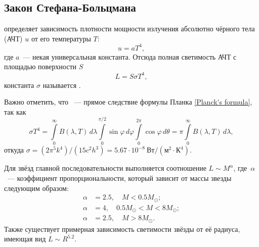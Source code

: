 \subsection{Закон Стефана-Больцмана}
 определяет зависимость плотности мощности излучения абсолютно чёрного тела (АЧТ) $u$ от его температуры $T$:
\begin{equation}
u = a T^4,
\end{equation} 
где $a$~--- некая универсальная константа.
Отсюда полная светимость АЧТ с площадью поверхности $S$
	\begin{equation}
	L = S \sigma T^4,
	\label{eq:steff-bol-law}
\end{equation}
константа $\sigma$ называется .
  
Важно отметить, что ~--- прямое следствие формулы Планка \eqref{Planck's formula}, так как
\begin{equation}
	\sigma T^4 = \int\limits^\infty_0 B(\lambda, T)\,d\lambda \int\limits_0^{\pi/2} \sin \varphi\, d\varphi \int\limits_0^{2\pi} \cos \varphi\, d\theta = \pi \int\limits^\infty_0 B(\lambda, T)\,d\lambda,
\end{equation}
откуда $\sigma = (2\pi^5k^4)/(15c^2h^3) = 5.67 \cdot 10^{-8}~\text{Вт}/(\text{м}^2\cdot \text{К}^4)$.

Для звёзд главной последовательности выполняется соотношение $L \sim M^{\alpha}$, где~$\alpha$~--- коэффициент пропорциональности, который зависит от массы звезды следующим образом:
\begin{align*}
\alpha &= 2.5,\quad M < 0.5 M_\odot; \\
\alpha &= 4, \quad 0.5 M_\odot < M < 8 M_\odot;\\ 
\alpha &= 2.5, \quad  M > 8 M_\odot. 
\end{align*}
Также существует примерная зависимость светимости звёзды от её радиуса, имеющая вид  $L\sim R^{5.2}$.
